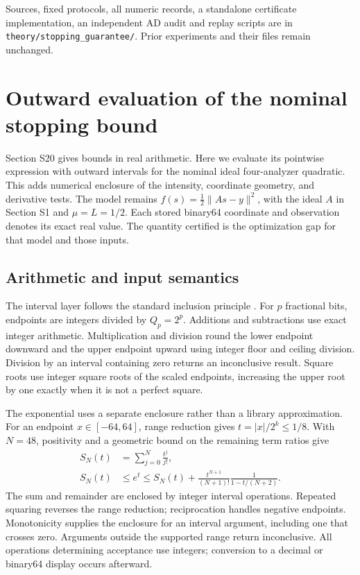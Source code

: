 \documentclass[10pt,a4paper]{article}
\begin{document}
Sources, fixed protocols, all numeric records, a standalone certificate implementation, an independent AD audit and replay scripts are in \nolinkurl{theory/stopping_guarantee/}. Prior experiments and their files remain unchanged.


\section{Outward evaluation of the nominal stopping bound}
\label{sec:svalidated}
Section S20 gives bounds in real arithmetic. Here we evaluate its pointwise expression with outward intervals for the nominal ideal four-analyzer quadratic. This adds numerical enclosure of the intensity, coordinate geometry, and derivative tests. The model remains $f(s)=\tfrac12\|As-y\|^2$, with the ideal $A$ in Section S1 and $\mu=L=1/2$. Each stored binary64 coordinate and observation denotes its exact real value. The quantity certified is the optimization gap for that model and those inputs.

\subsection{Arithmetic and input semantics}
The interval layer follows the standard inclusion principle \cite[Secs.~5.3--5.5]{supp-rump}. For $p$ fractional bits, endpoints are integers divided by $Q_p=2^p$. Additions and subtractions use exact integer arithmetic. Multiplication and division round the lower endpoint downward and the upper endpoint upward using integer floor and ceiling division. Division by an interval containing zero returns an inconclusive result. Square roots use integer square roots of the scaled endpoints, increasing the upper root by one exactly when it is not a perfect square.

The exponential uses a separate enclosure rather than a library approximation. For an endpoint $x\in[-64,64]$, range reduction gives $t=|x|/2^k\le1/8$. With $N=48$, positivity and a geometric bound on the remaining term ratios give
\begin{equation}
 \begin{aligned}
 S_N(t)&=\sum_{j=0}^{N}\frac{t^j}{j!},\\
 S_N(t)&\le e^t\le S_N(t)+
 \frac{t^{N+1}}{(N+1)!}\frac{1}{1-t/(N+2)}.
 \end{aligned}
 \label{eq:intervalexp}
\end{equation}
The sum and remainder are enclosed by integer interval operations. Repeated squaring reverses the range reduction; reciprocation handles negative endpoints. Monotonicity supplies the enclosure for an interval argument, including one that crosses zero. Arguments outside the supported range return inconclusive. All operations determining acceptance use integers; conversion to a decimal or binary64 display occurs afterward.
\end{document}
